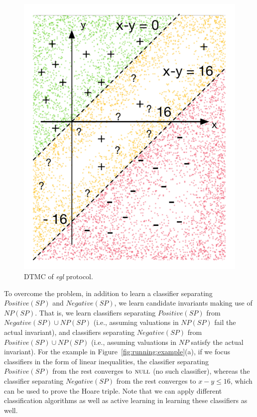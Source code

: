  \begin{figure}
	 \vspace{-8mm}
\centering
\includegraphics[scale=0.42]{figures/running-sampling.pdf}
 \caption{DTMC of \emph{egl} protocol.}
  \vspace{-6mm}
      \label{fig:running:example:sampling}
 \end{figure}

To overcome the problem, in addition to learn a classifier separating $Positive(SP)$ and $Negative(SP)$, we learn candidate invariants making use of $NP(SP)$. That is, we learn classifiers separating $Positive(SP)$ from $Negative(SP) \cup NP(SP)$ (i.e., assuming valuations in $NP(SP)$ fail the actual invariant), and classifiers separating $Negative(SP)$ from $Positive(SP) \cup NP(SP)$ (i.e., assuming valuations in $NP$ satisfy the actual invariant). For the example in Figure~\ref{fig:running:example}(a), if we focus classifiers in the form of linear inequalities, the classifier separating $Positive(SP)$ from the rest converges to $\textsc{null}$ (no such classifier), whereas the classifier separating $Negative(SP)$ from the rest converges to $x - y \leq 16$, which can be used to prove the Hoare triple. Note that we can apply different classification algorithms as well as active learning in learning these classifiers as well.

%
